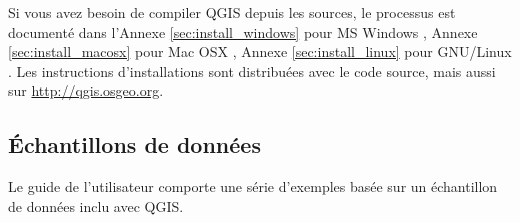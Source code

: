 Si vous avez besoin de compiler QGIS depuis les sources, le processus est document\'e dans l'Annexe \ref{sec:install_windows} pour MS Windows \win, Annexe \ref{sec:install_macosx} pour Mac OSX \osx, Annexe \ref{sec:install_linux} pour GNU/Linux \nix. Les instructions d'installations sont distribu\'ees avec le code source, mais aussi sur \url{http://qgis.osgeo.org}.

%
%
%

\subsection{\'Echantillons de donn\'ees}\label{label_sampledata}  

Le guide de l'utilisateur comporte une s\'erie d'exemples bas\'ee sur un \'echantillon de donn\'ees inclu avec QGIS.

